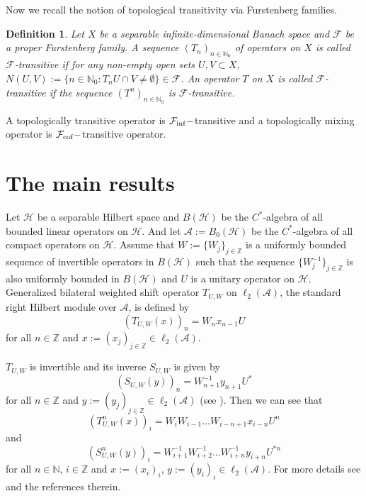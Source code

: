 \documentclass{article}
\newtheorem {definition}[theorem]{Definition}
\begin{document}
Now we recall the notion of topological transitivity via Furstenberg families.
\begin{definition}\textnormal{\cite{BMPP19}
Let $X$ be a separable infinite-dimensional Banach space and $\mathcal{F}$ be a proper Furstenberg family.
A sequence $(T_{n})_{n\in \mathbb{N}_{0}}$ of operators on $X$ is called \textit{$\mathcal{F}$-transitive} if for any non-empty open sets $U,V\subset X$,  $N(U,V):=\{n\in\mathbb{N}_{0}: T_{n}U\cap V\neq \emptyset\}\in \mathcal{F}$. An operator $T$ on $X$ is called \textit{$\mathcal{F}$-transitive} if the sequence $(T^{n})_{n\in\mathbb{N}_{0}}$ is $\mathcal{F}$-transitive.
}\end{definition}

A topologically transitive operator is $\mathcal{F}_{\rm inf}-$transitive and a topologically mixing operator is  $\mathcal{F}_{\rm cof}-$transitive operator.



\section{The main results}
Let $\mathcal{H}$ be a separable Hilbert space and $B(\mathcal{H})$ be the $C^{\ast}$-algebra of all bounded linear operators on $\mathcal{H}$. And let $\mathcal{A}:=B_{0}(\mathcal{H})$ be the $C^{\ast}$-algebra of all compact operators on $\mathcal{H}$. Assume that $W:=\{W_{j}\}_{j\in\mathbb{Z}}$ is a uniformly bounded sequence of invertible operators in $B(\mathcal{H})$ such that the sequence $\{W^{-1}_{j}\}_{j\in\mathbb{Z}}$ is also uniformly bounded in $B(\mathcal{H})$ and $U$ is a unitary operator on $\mathcal{H}$. Generalized bilateral weighted shift operator $T_{U, W}$ on $\ell_{2}(\mathcal{A})$, the standard right Hilbert module over $\mathcal{A}$, is defined by
\[(T_{U,W}(x))_{n}=W_{n}x_{n-1}U\]
for all $n\in\mathbb{Z}$ and $x:=(x_{j})_{j\in\mathbb{Z}}\in\ell_{2}(\mathcal{A})$.

$T_{U,W}$ is invertible and its inverse $S_{U,W}$ is given by
\[(S_{U,W}(y))_{n}=W^{-1}_{n+1}y_{n+1}U^{\ast}\]
for all $n\in\mathbb{Z}$ and $y:=(y_{j})_{j\in\mathbb{Z}}\in\ell_{2}(\mathcal{A})$ (see \cite{I24}).
Then we can see that
\[(T^{n}_{U,W}(x))_{i}=W_{i}W_{i-1}...W_{i-n+1}x_{i-n}U^{n}\]
and
\[(S^{n}_{U,W}(y))_{i}=W^{-1}_{i+1}W^{-1}_{i+2}...W^{-1}_{i+n}y_{i+n}U^{\ast n}\]
for all $n\in\mathbb{N}$, $i\in\mathbb{Z}$ and $x:=(x_{i})_{i}$, $y:=(y_{i})_{i}\in \ell_{2}(\mathcal{A})$. For more details see \cite{I24} and the references therein.
\end{document}
